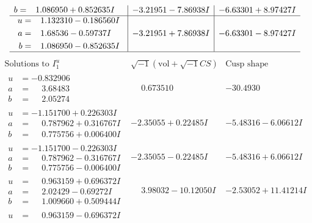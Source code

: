 \documentclass[1p]{elsarticle_modified}
\theoremstyle{definition}
\newcommand{\I}{\sqrt{-1}}
\begin{document}
$$\begin{array}{c|c|c}
\begin{aligned}
b &= \phantom{-}1.086950 + 0.852635 I\end{aligned}
 & -3.21951 - 7.86938 I & -6.63301 + 8.97427 I \\ \hline\begin{aligned}
u &= \phantom{-}1.132310 - 0.186560 I \\
a &= \phantom{-}1.68536 - 0.59737 I \\
b &= \phantom{-}1.086950 - 0.852635 I\end{aligned}
 & -3.21951 + 7.86938 I & -6.63301 - 8.97427 I\\
 \hline 
 \end{array}$$\newpage$$\begin{array}{c|c|c}  
\text{Solutions to }I^u_{1}& \I (\text{vol} + \sqrt{-1}CS) & \text{Cusp shape}\\
 \hline 
\begin{aligned}
u &= -0.832906\phantom{ +0.000000I} \\
a &= \phantom{-}3.68483\phantom{ +0.000000I} \\
b &= \phantom{-}2.05274\phantom{ +0.000000I}\end{aligned}
 & \phantom{-}0.673510\phantom{ +0.000000I} & -30.4930\phantom{ +0.000000I} \\ \hline\begin{aligned}
u &= -1.151700 + 0.226303 I \\
a &= \phantom{-}0.787962 + 0.316767 I \\
b &= \phantom{-}0.775756 + 0.006400 I\end{aligned}
 & -2.35055 + 0.22485 I & -5.48316 - 6.06612 I \\ \hline\begin{aligned}
u &= -1.151700 - 0.226303 I \\
a &= \phantom{-}0.787962 - 0.316767 I \\
b &= \phantom{-}0.775756 - 0.006400 I\end{aligned}
 & -2.35055 - 0.22485 I & -5.48316 + 6.06612 I \\ \hline\begin{aligned}
u &= \phantom{-}0.963159 + 0.696372 I \\
a &= \phantom{-}2.02429 - 0.69272 I \\
b &= \phantom{-}1.009660 + 0.509444 I\end{aligned}
 & \phantom{-}3.98032 - 10.12050 I & -2.53052 + 11.41214 I \\ \hline\begin{aligned}
u &= \phantom{-}0.963159 - 0.696372 I \\

\end{aligned}
\end{array}$$
\end{document}
